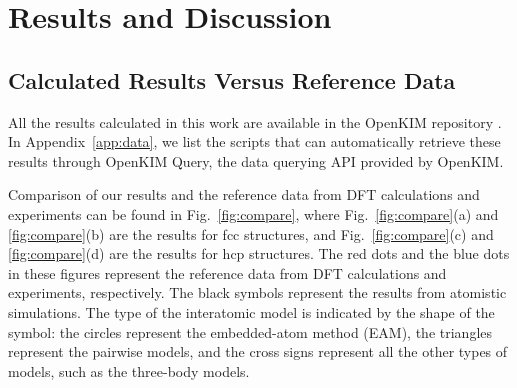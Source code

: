 \documentclass[%
 reprint,
 amsmath,amssymb,
 aps,
]{revtex4-1}
\begin{document}
\section{\label{sec:results}Results and Discussion}

\subsection{\label{sec:calcvsref}Calculated Results Versus Reference Data}

All the results calculated in this work are available in the OpenKIM repository \cite{openkim2016}.
In Appendix~\ref{app:data}, we list the scripts that can automatically retrieve these results through OpenKIM Query, the data querying API provided by OpenKIM.

Comparison of our results and the reference data from DFT calculations and experiments can be found in Fig.~\ref{fig:compare}, where Fig.~\ref{fig:compare}(a) and \ref{fig:compare}(b) are the results for fcc structures, and Fig.~\ref{fig:compare}(c) and \ref{fig:compare}(d) are the results for hcp structures.
The red dots and the blue dots in these figures represent the reference data from DFT calculations and experiments, respectively.
The black symbols represent the results from atomistic simulations.
The type of the interatomic model is indicated by the shape of the symbol: the circles represent the embedded-atom method (EAM), the triangles represent the pairwise models, and the cross signs represent all the other types of models, such as the three-body models.
\end{document}
